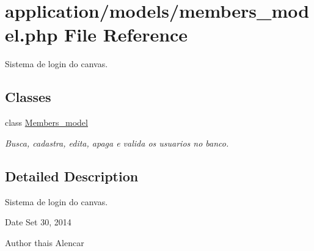 \hypertarget{members__model_8php}{\section{application/models/members\-\_\-model.php File Reference}
\label{members__model_8php}
}


Sistema de login do canvas.  


\subsection*{Classes}
\begin{DoxyCompactItemize}
\item 
class \hyperlink{classMembers__model}{Members\-\_\-model}
\begin{DoxyCompactList}\small\item\em Busca, cadastra, edita, apaga e valida os usuarios no banco. \end{DoxyCompactList}\end{DoxyCompactItemize}


\subsection{Detailed Description}
Sistema de login do canvas. \begin{DoxyDate}{Date}
Set 30, 2014 
\end{DoxyDate}
\begin{DoxyAuthor}{Author}
thais Alencar 
\end{DoxyAuthor}
